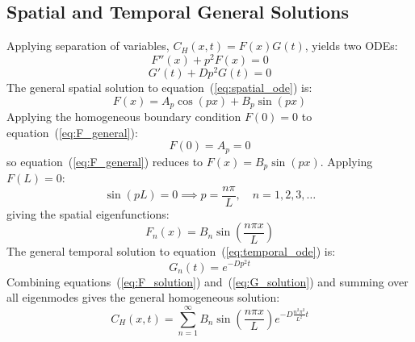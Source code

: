 \documentclass[a4paper,12pt]{article} %
\newcommand{\CH}{C_{H}}
\begin{document}
\subsection{Spatial and Temporal General Solutions}
Applying separation of variables, $\CH(x,t) = F(x)G(t)$, yields two ODEs:
\begin{equation}
    \label{eq:spatial_ode}
    F''(x) + p^2 F(x) = 0
\end{equation}
\begin{equation}
    \label{eq:temporal_ode}
    G'(t) + Dp^2 G(t) = 0
\end{equation}
The general spatial solution to equation~(\ref{eq:spatial_ode}) is:
\begin{equation}
    \label{eq:F_general}
    F(x) = A_p\cos(px) + B_p\sin(px)
\end{equation}
Applying the homogeneous boundary condition $F(0) = 0$ to equation~(\ref{eq:F_general}):
\begin{equation}
    \label{eq:Ap_zero}
    F(0) = A_p = 0
\end{equation}
so equation~(\ref{eq:F_general}) reduces to $F(x) = B_p\sin(px)$. Applying $F(L) = 0$:
\begin{equation}
    \label{eq:eigenvalue}
    \sin(pL) = 0 \implies p = \frac{n\pi}{L}, \quad n = 1, 2, 3, \ldots
\end{equation}
giving the spatial eigenfunctions:
\begin{equation}
    \label{eq:F_solution}
    F_n(x) = B_n\sin\!\left(\frac{n \pi x}{L}\right)
\end{equation}
The general temporal solution to equation~(\ref{eq:temporal_ode}) is:
\begin{equation}
    \label{eq:G_solution}
    G_n(t) = e^{-Dp^2 t}
\end{equation}
Combining equations~(\ref{eq:F_solution}) and~(\ref{eq:G_solution}) and summing over all eigenmodes gives the general homogeneous solution:
\begin{equation}
    \label{eq:Ch_series}
    \CH(x,t) = \sum_{n=1}^{\infty} B_{n}\sin\!\left(\frac{n \pi x}{L}\right)e^{-D \frac{n^2\pi^2}{L^2} t}
\end{equation}
\end{document}
